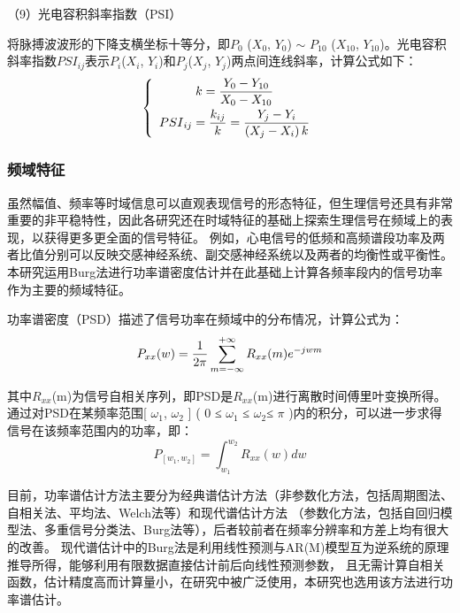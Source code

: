 （9）光电容积斜率指数（PSI）\cite{陈婉琳2019脉搏波形态学研究及其在子痫前期的应用}

将脉搏波波形的下降支横坐标十等分，即$P_0$ ($X_0$, $Y_0$) $\sim $ $P_{10}$ ($X_{10}$, $Y_{10}$)。光电容积斜率指数${PSI}_{ij}$表示$P_i$($X_i$, $Y_i$)和$P_j$($X_j$, $Y_j$)两点间连线斜率，计算公式如下：
\vspace{-1ex}
\begin{equation}
    \label{equ:K-value}
    \left\{\begin{array}{c}
        k=\displaystyle{\frac{Y_{0}-Y_{10}}{X_{0}-X_{10}}} \\
        \vspace{-2ex}
        \\
        {P S I}_{i j}=\displaystyle{\frac{k_{i j}}{k}}=\displaystyle{\frac{Y_{j}-Y_{i}}{\left(X_{j}-X_{i}\right) k}}
    \end{array}\right.
\end{equation}

\subsubsection{频域特征}
虽然幅值、频率等时域信息可以直观表现信号的形态特征，但生理信号还具有非常重要的非平稳特性，因此各研究还在时域特征的基础上探索生理信号在频域上的表现，以获得更多更全面的信号特征。
例如，心电信号的低频和高频谱段功率及两者比值分别可以反映交感神经系统、副交感神经系统以及两者的均衡性或平衡性。
本研究运用Burg法进行功率谱密度估计并在此基础上计算各频率段内的信号功率作为主要的频域特征。

功率谱密度（PSD）描述了信号功率在频域中的分布情况，计算公式为：
\vspace{-1ex}
\begin{equation}
    \label{equ:K-value}
        P_{x x}(w)=\frac{1}{2 \pi} \sum_{m=-\infty}^{+\infty} R_{x x}(m) e^{-j w m}
        \vspace{-1ex}
\end{equation}

其中$R_{xx}$(m)为信号自相关序列，即PSD是$R_{xx}$(m)进行离散时间傅里叶变换所得。
通过对PSD在某频率范围[ $\omega_1$, $\omega_2$ ] ( 0 ≤ $\omega_1$ ≤ $\omega_2 $≤ $\pi$ )内的积分，可以进一步求得信号在该频率范围内的功率，即：
\begin{equation}
    \label{equ:K-value}
        P_{\left[w_{1}, w_{2}\right]}=\int_{w_{1}}^{w_{2}} R_{x x}(w) d w
\end{equation}

目前，功率谱估计方法主要分为经典谱估计方法（非参数化方法，包括周期图法、自相关法、平均法、Welch法等）和现代谱估计方法
（参数化方法，包括自回归模型法、多重信号分类法、Burg法等），后者较前者在频率分辨率和方差上均有很大的改善。
现代谱估计中的Burg法是利用线性预测与AR(M)模型互为逆系统的原理推导所得\cite{刘金星2016现代谱估计技术的研究应用与}，能够利用有限数据直接估计前后向线性预测参数，
且无需计算自相关函数，估计精度高而计算量小，在研究中被广泛使用，本研究也选用该方法进行功率谱估计。

